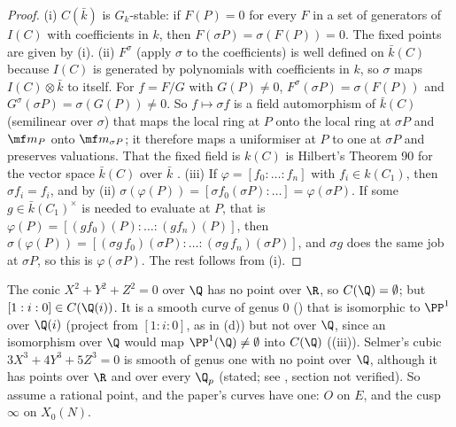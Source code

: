 \begin{proof}
(i) $C(\bar k)$ is $G_k$-stable: if $F(P)=0$ for every $F$ in a set of generators of $I(C)$ with coefficients in $k$, then $F(\sigma P)=\sigma(F(P))=0$. The
fixed points are given by (i). (ii) $F^\sigma$ (apply $\sigma$ to the coefficients) is well defined on $\bar k(C)$ because
$I(C)$ is generated by polynomials with coefficients in $k$, so $\sigma$ maps $I(C)\otimes\bar k$ to itself. For $f=F/G$ with $G(P)\ne0$,
$F^\sigma(\sigma P)=\sigma(F(P))$ and $G^\sigma(\sigma P)=\sigma(G(P))\ne0$. So $f\mapsto\sigma f$ is a field automorphism of $\bar k(C)$ (semilinear over $\sigma$) that maps the
local ring at $P$ onto the local ring at $\sigma P$ and $\mf m_P$ onto $\mf m_{\sigma P}$; it therefore maps a uniformiser at $P$ to one at $\sigma P$ and preserves
valuations. That the fixed field is $k(C)$ is Hilbert's Theorem 90 for the vector space $\bar k(C)$ over $\bar k$ \cite[Chapter II, Section 5]{SilvermanAEC}.
(iii) If $\varphi=[f_0:\dots:f_n]$ with $f_i\in k(C_1)$, then $\sigma f_i=f_i$, and by (ii) $\sigma(\varphi(P))=[\sigma f_0(\sigma P):\dots]=\varphi(\sigma P)$. If some $g\in\bar k(C_1)^\times$ is needed to evaluate at $P$, that is $\varphi(P)=[(gf_0)(P):\dots:(gf_n)(P)]$, then
$\sigma(\varphi(P))=[(\sigma g\,f_0)(\sigma P):\dots:(\sigma g\,f_n)(\sigma P)]$, and $\sigma g$ does the same job at $\sigma P$, so this is $\varphi(\sigma P)$. The rest follows
from (i).
\end{proof}

\begin{warning}\label{warn:curves:rational-points}
The conic $X^2+Y^2+Z^2=0$ over $\Q$ has no point over $\R$, so $C(\Q)=\emptyset$; but $[1:i:0]\in C(\Q(i))$. It is a smooth curve of genus $0$
() that is isomorphic to $\PP^1$ over $\Q(i)$ (project from $[1:i:0]$, as in (d)) but not over
$\Q$, since an isomorphism over $\Q$ would map $\PP^1(\Q)\ne\emptyset$ into $C(\Q)$ ((iii)). Selmer's cubic $3X^3+4Y^3+5Z^3=0$
is smooth of genus one with no point over $\Q$, although it has points over $\R$ and over every $\Q_p$ (stated; see \cite[Chapter X]{SilvermanAEC}, section not verified).
So  assume a rational point, and the paper's curves have one: $O$ on $E$, and the cusp
$\infty$ on $X_0(N)$.
\end{warning}


